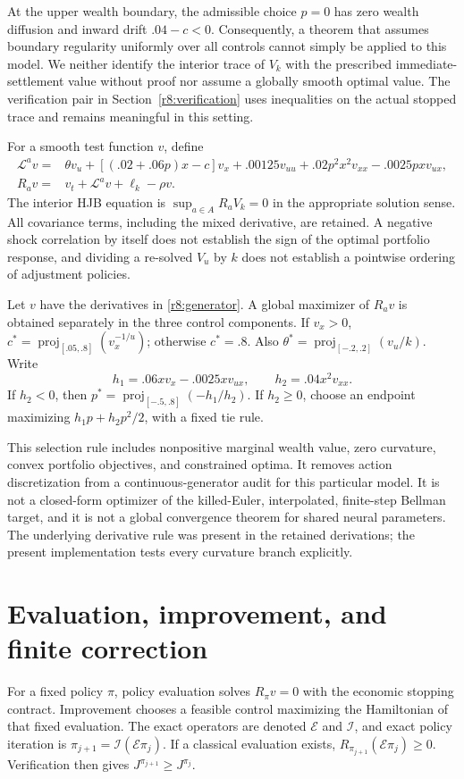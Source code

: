 At the upper wealth boundary, the admissible choice $p=0$ has zero wealth diffusion and inward drift $.04-c<0$. Consequently, a theorem that assumes boundary regularity uniformly over all controls cannot simply be applied to this model. We neither identify the interior trace of $V_k$ with the prescribed immediate-settlement value without proof nor assume a globally smooth optimal value. The verification pair in Section~\ref{r8:verification} uses inequalities on the actual stopped trace and remains meaningful in this setting.

For a smooth test function $v$, define
\begin{align}
 \mathcal L^a v={}&\theta v_u+[(.02+.06p)x-c]v_x
       +.00125v_{uu}+.02p^2x^2v_{xx}-.0025pxv_{ux},\\
 R_a v={}&v_t+\mathcal L^a v+\ell_k-\rho v.\label{r8:generator}
\end{align}
The interior HJB equation is $\sup_{a\in A}R_aV_k=0$ in the appropriate solution sense. All covariance terms, including the mixed derivative, are retained. A negative shock correlation by itself does not establish the sign of the optimal portfolio response, and dividing a re-solved $V_u$ by $k$ does not establish a pointwise ordering of adjustment policies.

\begin{proposition}\label{r8:selection}
Let $v$ have the derivatives in \eqref{r8:generator}. A global maximizer of $R_av$ is obtained separately in the three control components. If $v_x>0$, $c^*=\operatorname{proj}_{[.05,.8]}(v_x^{-1/u})$; otherwise $c^*=.8$. Also $\theta^*=\operatorname{proj}_{[-.2,.2]}(v_u/k)$. Write
\[
 h_1=.06xv_x-.0025xv_{ux},\qquad h_2=.04x^2v_{xx}.
\]
If $h_2<0$, then $p^*=\operatorname{proj}_{[-.5,.8]}(-h_1/h_2)$. If $h_2\geq0$, choose an endpoint maximizing $h_1p+h_2p^2/2$, with a fixed tie rule.
\end{proposition}
This selection rule includes nonpositive marginal wealth value, zero curvature, convex portfolio objectives, and constrained optima. It removes action discretization from a continuous-generator audit for this particular model. It is not a closed-form optimizer of the killed-Euler, interpolated, finite-step Bellman target, and it is not a global convergence theorem for shared neural parameters. The underlying derivative rule was present in the retained derivations; the present implementation tests every curvature branch explicitly.

\section{Evaluation, improvement, and finite correction}\label{r8:operators}
For a fixed policy $\pi$, policy evaluation solves $R_\pi v=0$ with the economic stopping contract. Improvement chooses a feasible control maximizing the Hamiltonian of that fixed evaluation. The exact operators are denoted $\mathcal E$ and $\mathcal I$, and exact policy iteration is $\pi_{j+1}=\mathcal I(\mathcal E\pi_j)$. If a classical evaluation exists, $R_{\pi_{j+1}}(\mathcal E\pi_j)\geq0$. Verification then gives $J^{\pi_{j+1}}\geq J^{\pi_j}$.

